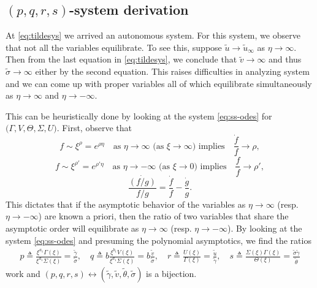 \documentclass[a4paper,11pt]{article}
\def\tg{{\tilde{\gamma}}}
\def\tv{{\tilde{v}}}
\def\tth{{\tilde{\theta}}}
\def\ts{{\tilde{\sigma}}}
\def\tu{{\tilde{u}}}
\begin{document}
\subsection{$(p,q,r,s)$-system derivation}
At \eqref{eq:tildesys} we arrived  an autonomous system. For this system, we observe that not all the variables equilibrate. To see this, suppose $\tu \rightarrow \tu_\infty$ as $\eta \rightarrow \infty$. Then from the last equation in \eqref{eq:tildesys}, we conclude that $\tv \rightarrow \infty$ and thus $\ts \rightarrow \infty$ either by the second equation. This raises difficulties in analyzing system and we can come up with proper variables all of which equilibrate simultaneously as $\eta \rightarrow \infty$ and $\eta \rightarrow -\infty$.

This can be heuristically done by looking at the system \eqref{eq:ss-odes} for $\big(\Gamma,V,\Theta,\Sigma,U)$. First, observe that
$$ f \sim \xi^\rho=e^{\rho\eta} \quad \text{as $\eta \rightarrow \infty$ (as $\xi \rightarrow \infty$) implies} \quad \frac{\dot{f}}{f} \rightarrow \rho,$$
$$ f \sim \xi^{\rho'}=e^{\rho'\eta} \quad \text{as $\eta \rightarrow -\infty$ (as $\xi \rightarrow 0$) implies} \quad \frac{\dot{f}}{f} \rightarrow \rho',$$
$$ \frac{\dot{(f/g)}}{f/g} = \frac{\dot{f}}{f} - \frac{\dot{g}}{g}. $$
This dictates that if the asymptotic behavior of the variables as $\eta \rightarrow \infty$ (resp. $\eta \rightarrow -\infty$) are known a priori, then the ratio of two variables that share the asymptotic order will equilibrate as $\eta \rightarrow \infty$ (resp. $\eta \rightarrow -\infty$). By looking at the system \eqref{eq:ss-odes} and presuming the polynomial asymptotics, we find the ratios
\begin{equation}\label{eq:pqrdef}
 \begin{aligned}
  p \triangleq \frac{ \xi^{a_1} \Gamma(\xi)}{\xi^{d_1} \Sigma(\xi)}=\frac{\tg}{\ts}, \quad q \triangleq b\frac{ \xi^{b_1} V(\xi) }{ \xi^{d_1} \Sigma(\xi)}=b \frac{\tv}{\ts},  \quad r \triangleq \frac{ U(\xi) }{ \Gamma(\xi) } = \frac{\tu}{\tg}, \quad s \triangleq \frac{\Sigma(\xi)\Gamma(\xi)}{\Theta(\xi)} = \frac{\ts\tg}{\tth}
 \end{aligned}
\end{equation}
 work and $(p,q,r,s) \leftrightarrow (\tg,\tv, \tth,\ts)$ is a bijection.
 
\end{document}
